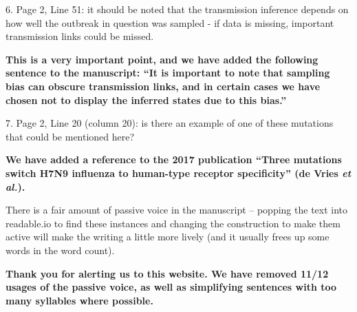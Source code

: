 \documentclass[11pt,oneside,letterpaper]{article}
\begin{document}
6. Page 2, Line 51: it should be noted that the transmission inference depends on how well the outbreak in question was sampled - if data is missing, important transmission links could be missed.

\textbf{This is a very important point, and we have added the following sentence to the manuscript: ``It is important to note that sampling bias can obscure transmission links, and in certain cases we have chosen not to display the inferred states due to this bias.''}

7. Page 2, Line 20 (column 20): is there an example of one of these mutations that could be mentioned here?

\textbf{We have added a reference to the 2017 publication ``Three mutations switch H7N9 influenza to human-type receptor specificity'' (de Vries \textit{et al.}).}

There is a fair amount of passive voice in the manuscript -- popping the text into readable.io to find these instances and changing the construction to make them active will make the writing a little more lively (and it usually frees up some words in the word count).

\textbf{Thank you for alerting us to this website. We have removed 11/12 usages of the passive voice, as well as simplifying sentences with too many syllables where possible.}
\end{document}
